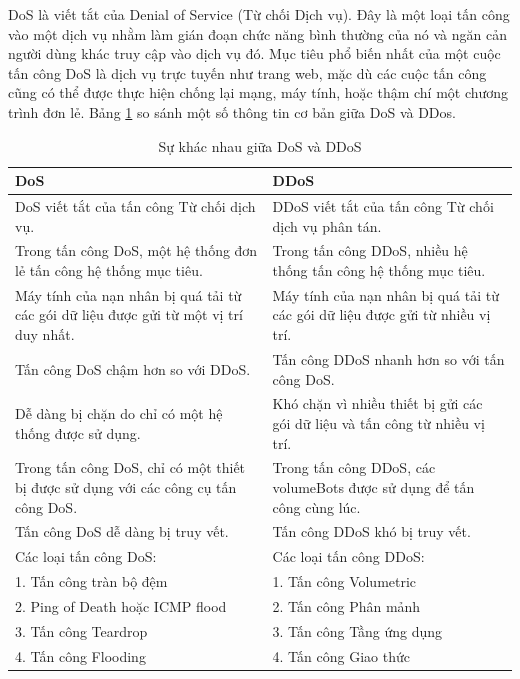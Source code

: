 \documentclass[a4paper]{article}
\begin{document}
DoS là viết tắt của Denial of Service (Từ chối Dịch vụ). Đây là một loại tấn công vào một dịch vụ nhằm làm gián đoạn chức năng bình thường của nó và ngăn cản người dùng khác truy cập vào dịch vụ đó. Mục tiêu phổ biến nhất của một cuộc tấn công DoS là dịch vụ trực tuyến như trang web, mặc dù các cuộc tấn công cũng có thể được thực hiện chống lại mạng, máy tính, hoặc thậm chí một chương trình đơn lẻ. Bảng \ref{tab:dos-ddos} so sánh một số thông tin cơ bản giữa DoS và DDos. 
\begin{table}[H]
    \centering
    \caption{Sự khác nhau giữa DoS và DDoS\cite{geeksforgeeks_ddos_1}}
    \label{tab:dos-ddos}
    \addvspace{0.3cm}
    \begin{tabular}{| p{7cm} | p{7cm} |}
    \hline
    \textbf{DoS} & \textbf{DDoS} \\
    \hline
    DoS viết tắt của tấn công Từ chối dịch vụ. & DDoS viết tắt của tấn công Từ chối dịch vụ phân tán. \\
    \hline
    Trong tấn công DoS, một hệ thống đơn lẻ tấn công hệ thống mục tiêu. & Trong tấn công DDoS, nhiều hệ thống tấn công hệ thống mục tiêu. \\
    \hline
    Máy tính của nạn nhân bị quá tải từ các gói dữ liệu được gửi từ một vị trí duy nhất. & Máy tính của nạn nhân bị quá tải từ các gói dữ liệu được gửi từ nhiều vị trí. \\
    \hline
    Tấn công DoS chậm hơn so với DDoS. & Tấn công DDoS nhanh hơn so với tấn công DoS. \\
    \hline
    Dễ dàng bị chặn do chỉ có một hệ thống được sử dụng. & Khó chặn vì nhiều thiết bị gửi các gói dữ liệu và tấn công từ nhiều vị trí. \\
    \hline
    Trong tấn công DoS, chỉ có một thiết bị được sử dụng với các công cụ tấn công DoS. & Trong tấn công DDoS, các volumeBots được sử dụng để tấn công cùng lúc. \\
    \hline
    Tấn công DoS dễ dàng bị truy vết. & Tấn công DDoS khó bị truy vết. \\
    \hline
    Các loại tấn công DoS: &  Các loại tấn công DDoS:  \\
    1. Tấn công tràn bộ đệm & 1. Tấn công Volumetric \\ 
    2. Ping of Death hoặc ICMP flood & 2. Tấn công Phân mảnh \\ 
    3. Tấn công Teardrop & 3. Tấn công Tầng ứng dụng \\
    4. Tấn công Flooding & 4. Tấn công Giao thức \\
    \hline
    \end{tabular}
\end{table}
\end{document}
